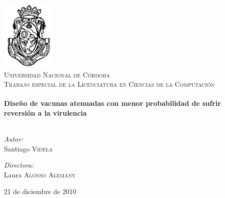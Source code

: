 \begin{titlepage}

\begin{center}

\includegraphics[scale=0.5]{famaf}\\[1cm]    

\textsc{\LARGE Universidad Nacional de C\'ordoba}\\[1.5cm]

\textsc{\Large Trabajo especial de la Licenciatura en Ciencias de la
Computaci\'on}\\[0.5cm]


\HRule \\[0.4cm]
{ \huge \bfseries Dise\~no de vacunas atenuadas con menor probabilidad de
sufrir reversi\'on a la virulencia}\\[0.4cm]

\HRule \\[1.5cm]

\begin{minipage}{0.4\textwidth}
\begin{flushleft} \large
\emph{Autor:}\\
Santiago \textsc{Videla}
\end{flushleft}
\end{minipage}
\begin{minipage}{0.4\textwidth}
\begin{flushright} \large
\emph{Directora:} \\
Laura \textsc{Alonso Alemany}
\end{flushright}
\end{minipage}

\vfill


{\large 21 de diciembre de 2010} 
\end{center}





\end{titlepage}